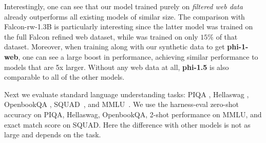 Interestingly, one can see that our \phionenlbase model trained purely on \textit{filtered web data} already outperforms all existing models of similar size. The comparison with Falcon-rw-1.3B is particularly interesting since the latter model was trained on the full Falcon refined web dataset, while \phionenlbase was trained on only $15\%$ of that dataset. Moreover, when training along with our synthetic data to get \textbf{phi-1-web}, one can see a large boost in performance, achieving similar performance to models that are 5x larger. Without any web data at all, \textbf{phi-1.5} is also comparable to all of the other models.

Next we evaluate standard language understanding tasks: PIQA \cite{bisk2019piqa}, Hellaswag \cite{zellers2019hellaswag}, OpenbookQA \cite{mihaylov2018can}, SQUAD~\cite{rajpurkar2016squad}, and MMLU~\cite{hendrycks2020}. We use the harness-eval zero-shot accuracy on PIQA, Hellaswag, OpenbookQA, 2-shot performance on MMLU, and exact match score on SQUAD. Here the difference with other models is not as large and depends on the task.

\begin{table}[h!]
\centering
\small
\label{tab:my_table2}
\caption{Language Understanding and Knowledge Benchmarks.}
\end{table}

